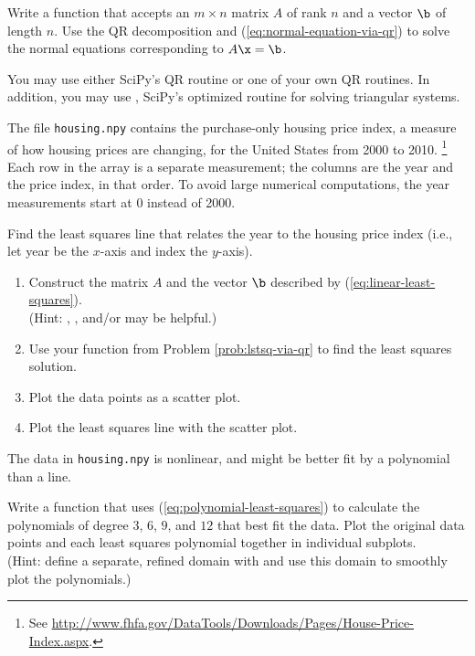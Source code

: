 Write a function that accepts an $m \times n$ matrix $A$ of rank $n$ and a vector $\b$ of length $n$.
Use the QR decomposition and (\ref{eq:normal-equation-via-qr}) to solve the normal equations corresponding to $A\x = \b$.

You may use either SciPy's QR routine or one of your own QR routines.
In addition, you may use , SciPy's optimized routine for solving triangular systems.

\label{prob:lstsq-via-qr}

The file \texttt{housing.npy} contains the purchase-only housing price index, a measure of how housing prices are changing, for the United States from 2000 to 2010.%
\footnote{See \url{http://www.fhfa.gov/DataTools/Downloads/Pages/House-Price-Index.aspx}.}
Each row in the array is a separate measurement; the columns are the year and the price index, in that order.
To avoid large numerical computations, the year measurements start at 0 instead of 2000.

Find the least squares line that relates the year to the housing price index (i.e., let year be the $x$-axis and index the $y$-axis).

\begin{enumerate}
    \item Construct the matrix $A$ and the vector $\b$ described by (\ref{eq:linear-least-squares}).\\
    (Hint: , , and/or  may be helpful.)
    \item Use your function from Problem \ref{prob:lstsq-via-qr} to find the least squares solution.
    \item Plot the data points as a scatter plot.
    \item Plot the least squares line with the scatter plot.\\
\end{enumerate}
The data in \texttt{housing.npy} is nonlinear, and might be better fit by a polynomial than a line.

Write a function that uses (\ref{eq:polynomial-least-squares}) to calculate the polynomials of degree $3$, $6$, $9$, and $12$ that best fit the data.
Plot the original data points and each least squares polynomial together in individual subplots.
\\(Hint: define a separate, refined domain with  and use this domain to smoothly plot the polynomials.)

